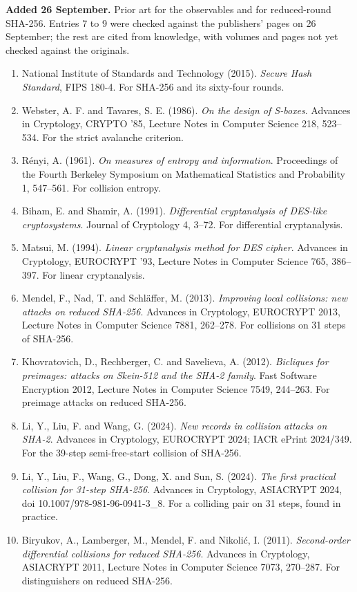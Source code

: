 \textbf{Added 26 September.} Prior art for the observables and for reduced-round SHA-256. Entries 7 to 9 were checked against the publishers' pages on 26 September; the rest are cited from knowledge, with volumes and pages not yet checked against the originals.

\begin{enumerate}
  \item National Institute of Standards and Technology (2015). \emph{Secure Hash Standard}, FIPS 180-4. For SHA-256 and its sixty-four rounds.
  \item Webster, A. F. and Tavares, S. E. (1986). \emph{On the design of S-boxes}. Advances in Cryptology, CRYPTO '85, Lecture Notes in Computer Science 218, 523--534. For the strict avalanche criterion.
  \item R\'enyi, A. (1961). \emph{On measures of entropy and information}. Proceedings of the Fourth Berkeley Symposium on Mathematical Statistics and Probability 1, 547--561. For collision entropy.
  \item Biham, E. and Shamir, A. (1991). \emph{Differential cryptanalysis of DES-like cryptosystems}. Journal of Cryptology 4, 3--72. For differential cryptanalysis.
  \item Matsui, M. (1994). \emph{Linear cryptanalysis method for DES cipher}. Advances in Cryptology, EUROCRYPT '93, Lecture Notes in Computer Science 765, 386--397. For linear cryptanalysis.
  \item Mendel, F., Nad, T. and Schl\"affer, M. (2013). \emph{Improving local collisions: new attacks on reduced SHA-256}. Advances in Cryptology, EUROCRYPT 2013, Lecture Notes in Computer Science 7881, 262--278. For collisions on 31 steps of SHA-256.
  \item Khovratovich, D., Rechberger, C. and Savelieva, A. (2012). \emph{Bicliques for preimages: attacks on Skein-512 and the SHA-2 family}. Fast Software Encryption 2012, Lecture Notes in Computer Science 7549, 244--263. For preimage attacks on reduced SHA-256.
  \item Li, Y., Liu, F. and Wang, G. (2024). \emph{New records in collision attacks on SHA-2}. Advances in Cryptology, EUROCRYPT 2024; IACR ePrint 2024/349. For the 39-step semi-free-start collision of SHA-256.
  \item Li, Y., Liu, F., Wang, G., Dong, X. and Sun, S. (2024). \emph{The first practical collision for 31-step SHA-256}. Advances in Cryptology, ASIACRYPT 2024, doi 10.1007/978-981-96-0941-3\_8. For a colliding pair on 31 steps, found in practice.
  \item Biryukov, A., Lamberger, M., Mendel, F. and Nikoli\'c, I. (2011). \emph{Second-order differential collisions for reduced SHA-256}. Advances in Cryptology, ASIACRYPT 2011, Lecture Notes in Computer Science 7073, 270--287. For distinguishers on reduced SHA-256.
\end{enumerate}
